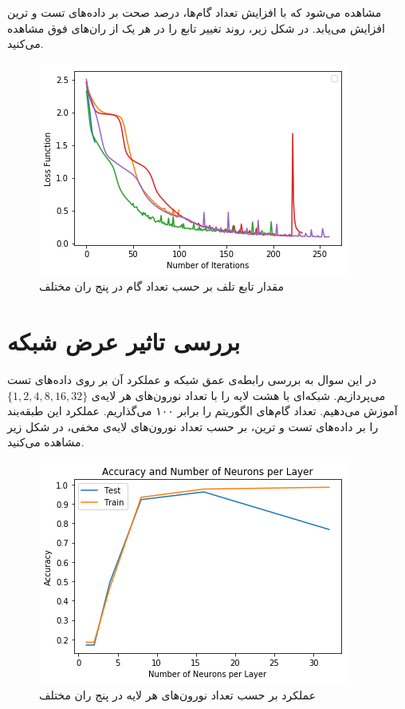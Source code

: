 \documentclass[a4paper]{article}
\begin{document}
\begin{large}
مشاهده می‌شود که با افزایش تعداد گام‌ها، درصد صحت بر داده‌های تست و ترین افزایش می‌یابد. در شکل زیر، روند تغییر تابع
را در هر یک از ران‌های فوق مشاهده می‌کنید.
\begin{figure}[h!]
	\centering
	\includegraphics[scale=0.7]{2.png}
	\caption{مقدار تابع تلف بر حسب تعداد گام در پنج ران مختلف}
\end{figure}

\section{بررسی تاثیر عرض شبکه}
در این سوال به بررسی رابطه‌ی عمق شبکه و عملکرد آن بر روی داده‌های تست می‌پردازیم. 
شبکه‌ای با هشت لایه را با تعداد نورون‌های هر لایه‌ی 
$\{1,2,4,8,16,32\}$
آموزش می‌دهیم. تعداد گام‌های الگوریتم 
را برابر ۱۰۰ می‌گذاریم. عملکرد این طبقه‌بند را بر داده‌های تست و ترین، بر حسب تعداد نورون‌های لایه‌ی مخفی، در شکل زیر مشاهده می‌کنید.
\begin{figure}[h!]
	\centering
	\includegraphics[scale=0.7]{3.png}
	\caption{عملکرد بر حسب تعداد نورون‌های هر لایه در پنج ران مختلف}
\end{figure}


\end{large}
\end{document}
